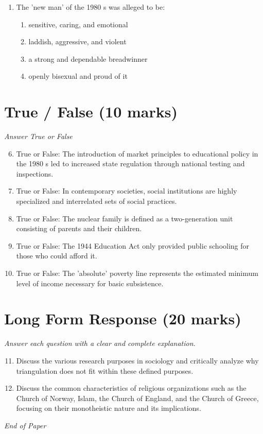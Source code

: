 \documentclass[12pt]{article}
\begin{document}
\begin{enumerate}[label=\arabic*.]
\begin{enumerate}[label=(\alph*)]
    \item Marquesses of England, Earls of Great Britain, King's Brothers
    \item Esquires, Serjeants of Law, Dukes' Eldest Sons
    \item King's Grandsons, Lord High Treasurer, Companions of the Bath
\end{enumerate}
\item The 'new man' of the 1980 s was alleged to be:
\begin{enumerate}[label=(\alph*)]
    \item sensitive, caring, and emotional
    \item laddish, aggressive, and violent
    \item a strong and dependable breadwinner
    \item openly bisexual and proud of it
\end{enumerate}
\end{enumerate}

\section*{True / False (10 marks)}
\textit{Answer True or False}
\begin{enumerate}[label=\arabic*.]
\setcounter{enumi}{5}
\item True or False: The introduction of market principles to educational policy in the 1980 s led to increased state regulation through national testing and inspections.
\item True or False: In contemporary societies, social institutions are highly specialized and interrelated sets of social practices.
\item True or False: The nuclear family is defined as a two-generation unit consisting of parents and their children.
\item True or False: The 1944 Education Act only provided public schooling for those who could afford it.
\item True or False: The 'absolute' poverty line represents the estimated minimum level of income necessary for basic subsistence.
\end{enumerate}

\section*{Long Form Response (20 marks)}
\textit{Answer each question with a clear and complete explanation.}
\begin{enumerate}[label=\arabic*.]
\setcounter{enumi}{10}
\item Discuss the various research purposes in sociology and critically analyze why triangulation does not fit within these defined purposes.
\item Discuss the common characteristics of religious organizations such as the Church of Norway, Islam, the Church of England, and the Church of Greece, focusing on their monotheistic nature and its implications.
\end{enumerate}

\vfill
\noindent\textit{End of Paper}
\end{document}

